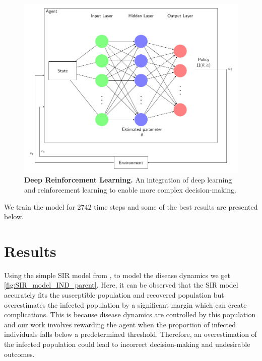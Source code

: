 \documentclass[tikz,fleqn,12pt]{wlscirep}
\begin{document}
\begin{figure}[htbp!]
  \centering
  \includegraphics[width=0.7\linewidth]{images/sir_arch.pdf}
  \caption{\textbf{Deep Reinforcement Learning.} An integration of deep learning and reinforcement learning to enable more complex decision-making.}
  \label{fig:sir_arch}
\end{figure}

We train the model for $2742$ time steps and some of the best results are presented below.


\section{Results}
Using the simple SIR model from ,  to model the disease dynamics we get \cref{fig:SIR_model_IND_parent}. Here, it can be observed that the SIR model accurately fits the susceptible population and recovered population but overestimates the infected population by a significant margin which can create complications. This is because disease dynamics are controlled by this population and our work involves rewarding the agent when the proportion of infected individuals falls below a predetermined threshold. Therefore, an overestimation of the infected population could lead to incorrect decision-making and undesirable outcomes.
\end{document}
